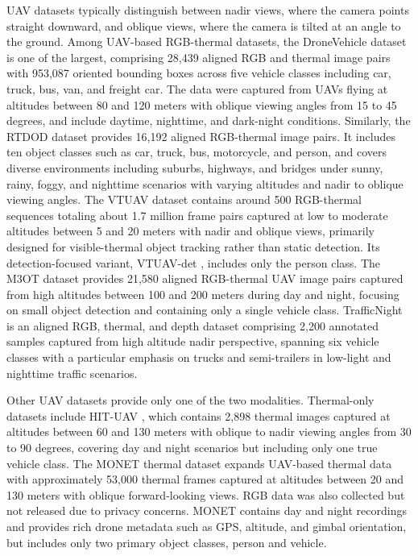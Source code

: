 \documentclass[12pt,oneside,bibtotoc,liststotoc]{scrbook}
\begin{document}
UAV datasets typically distinguish between nadir views, where the camera points
straight downward, and oblique views, where the camera is tilted at an angle to the ground.
Among UAV-based RGB-thermal datasets, the DroneVehicle dataset
\cite{sun2022droneVehicleRGBThermalUAVDataset} is one of the largest,
comprising 28,439 aligned RGB and thermal image pairs with 953,087
oriented bounding boxes across five vehicle classes including car,
truck, bus, van, and freight car. The data were captured from UAVs
flying at altitudes between 80 and 120 meters with oblique viewing angles
from 15 to 45 degrees, and include daytime, nighttime, and
dark-night conditions. Similarly, the RTDOD dataset
\cite{feng2023rtdodDataset} provides 16,192 aligned RGB-thermal
image pairs. It includes ten object classes such as car,
truck, bus, motorcycle, and person, and covers diverse environments
including suburbs, highways, and bridges under sunny, rainy, foggy,
and nighttime scenarios with varying altitudes and nadir to oblique viewing angles. The VTUAV dataset
\cite{zhang2022VTUAVDataset} contains around 500 RGB-thermal
sequences totaling about 1.7 million frame pairs captured at
low to moderate altitudes between 5 and 20 meters with nadir and
oblique views, primarily designed for visible-thermal object tracking
rather than static detection. Its detection-focused variant, VTUAV-det
\cite{zhang2023RGBTTinyPersonDetectionVTUAVDetDataset}, includes only
the person class. The M3OT dataset \cite{nie2025m3ot} provides 21,580
aligned RGB-thermal UAV image pairs captured from high altitudes
between 100 and 200 meters during day and night, focusing on small
object detection and containing only a single vehicle class.
TrafficNight is an aligned RGB, thermal, and depth dataset comprising
2,200 annotated samples captured from high altitude nadir perspective, spanning six
vehicle classes with a particular emphasis on trucks and semi-trailers
in low-light and nighttime traffic scenarios.
\cite{zhang2024trafficNightDataset}

Other UAV datasets provide only one of the two modalities. Thermal-only
datasets include HIT-UAV \cite{suo2023hitUAVDataset}, which contains 2,898
thermal images captured at altitudes between 60 and 130 meters with oblique to nadir viewing
angles from 30 to 90 degrees, covering day and night scenarios but including
only one true vehicle class. The MONET thermal dataset
\cite{riz2023monetDataset} expands UAV-based thermal data with approximately
53,000 thermal frames captured at altitudes between 20 and 130 meters with
oblique forward-looking views. RGB data was also collected but not released
due to privacy concerns. MONET contains day and night recordings and provides
rich drone metadata such as GPS, altitude, and gimbal orientation, but
includes only two primary object classes, person and vehicle.
\end{document}
